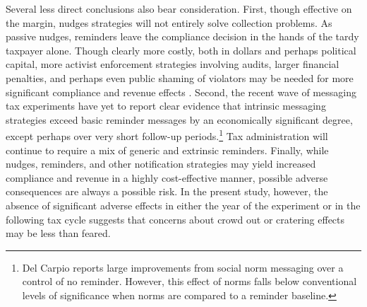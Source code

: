 \documentclass[12pt]{article}
\begin{document}
Several less direct conclusions also bear consideration. First, though effective on the margin, nudges strategies will not entirely solve collection problems. As passive nudges, reminders
leave the compliance decision in the hands of the tardy taxpayer
alone. Though
clearly more costly, both in dollars and perhaps political capital,
more activist enforcement strategies involving audits, larger
financial penalties, and perhaps even public shaming of violators may
be needed for more significant compliance and revenue effects \cite{ortega2015don}. Second, the recent wave of messaging tax experiments have yet to report clear
evidence that intrinsic messaging strategies exceed basic reminder
messages by an economically significant degree, except perhaps over very
short follow-up periods.\footnote{Del Carpio \citeyear{delcarpio}
  reports large improvements from social norm messaging over a control
  of no reminder.  However, this effect of norms falls below
  conventional levels of significance when norms are compared to a
  reminder baseline.} Tax administration will continue to require
  a mix of generic and extrinsic reminders. Finally, while nudges, reminders, and other notification strategies may
yield increased compliance and revenue in a highly cost-effective manner,
possible adverse consequences are always a possible risk. In the
present study, however, the absence of significant adverse effects in
either the year of the experiment or in the following tax cycle suggests that
concerns about crowd out
\cite{frey1997constitution} or cratering effects \cite{slemrod2017} may
be less than feared.


\nocite{dellavigna2012testing}

\newpage




\bigskip

\bigskip

\bigskip

\newpage
\end{document}
